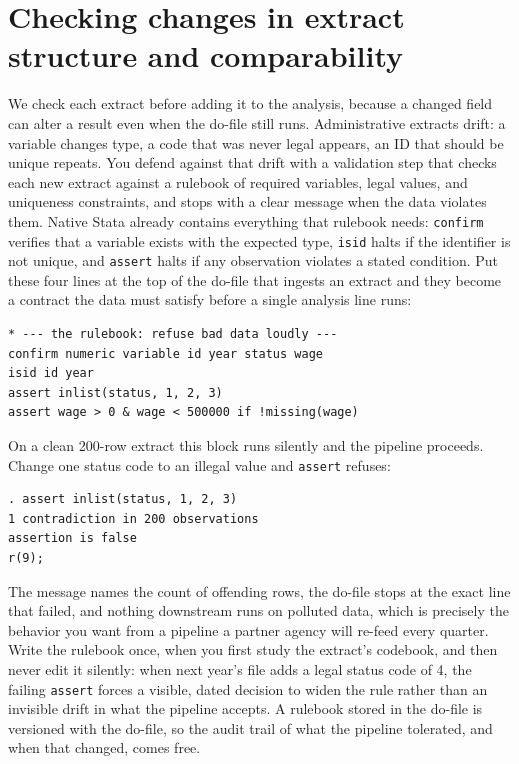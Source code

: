 \section{Checking changes in extract structure and comparability}\label{sec:ch06-schemadrift}
We check each extract before adding it to the analysis, because a changed field can alter a result even when the do-file still runs. Administrative extracts drift: a variable changes type, a code that was never legal appears, an ID that should be unique repeats. You defend against that drift with a validation step that checks each new extract against a rulebook of required variables, legal values, and uniqueness constraints, and stops with a clear message when the data violates them. Native Stata already contains everything that rulebook needs: \texttt{confirm} verifies that a variable exists with the expected type, \texttt{isid} halts if the identifier is not unique, and \texttt{assert} halts if any observation violates a stated condition. Put these four lines at the top of the do-file that ingests an extract and they become a contract the data must satisfy before a single analysis line runs:
\par
{\footnotesize
\begin{verbatim}
* --- the rulebook: refuse bad data loudly ---
confirm numeric variable id year status wage
isid id year
assert inlist(status, 1, 2, 3)
assert wage > 0 & wage < 500000 if !missing(wage)
\end{verbatim}
}
On a clean 200-row extract this block runs silently and the pipeline proceeds. Change one status code to an illegal value and \texttt{assert} refuses:
\par
{\footnotesize
\begin{verbatim}
. assert inlist(status, 1, 2, 3)
1 contradiction in 200 observations
assertion is false
r(9);
\end{verbatim}
}
The message names the count of offending rows, the do-file stops at the exact line that failed, and nothing downstream runs on polluted data, which is precisely the behavior you want from a pipeline a partner agency will re-feed every quarter. Write the rulebook once, when you first study the extract's codebook, and then never edit it silently: when next year's file adds a legal status code of 4, the failing \texttt{assert} forces a visible, dated decision to widen the rule rather than an invisible drift in what the pipeline accepts. A rulebook stored in the do-file is versioned with the do-file, so the audit trail of what the pipeline tolerated, and when that changed, comes free.

